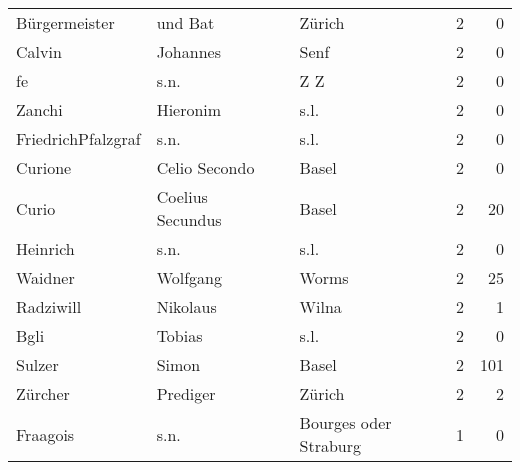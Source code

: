 \begin{center}
\begin{tiny}
\begin{longtabu}{llllrr}
            Bürgermeister &                            und Bat &             &                                      Zürich &          2 &         0 \\
                   Calvin &                           Johannes &             &                                        Senf &          2 &         0 \\
                       fe &                               s.n. &             &                                         Z Z &          2 &         0 \\
                   Zanchi &                           Hieronim &             &                                        s.l. &          2 &         0 \\
       FriedrichPfalzgraf &                               s.n. &             &                                        s.l. &          2 &         0 \\
                  Curione &                      Celio Secondo &             &                                       Basel &          2 &         0 \\
                    Curio &                   Coelius Secundus &             &                                       Basel &          2 &        20 \\
                 Heinrich &                               s.n. &             &                                        s.l. &          2 &         0 \\
                  Waidner &                           Wolfgang &             &                                       Worms &          2 &        25 \\
                Radziwill &                           Nikolaus &             &                                       Wilna &          2 &         1 \\
                     Bgli &                             Tobias &             &                                        s.l. &          2 &         0 \\
                   Sulzer &                              Simon &             &                                       Basel &          2 &       101 \\
                  Zürcher &                           Prediger &             &                                      Zürich &          2 &         2 \\
                 Fraagois &                               s.n. &             &                       Bourges oder Straburg &          1 &         0 \\

\end{longtabu}
\end{tiny}
\end{center}
